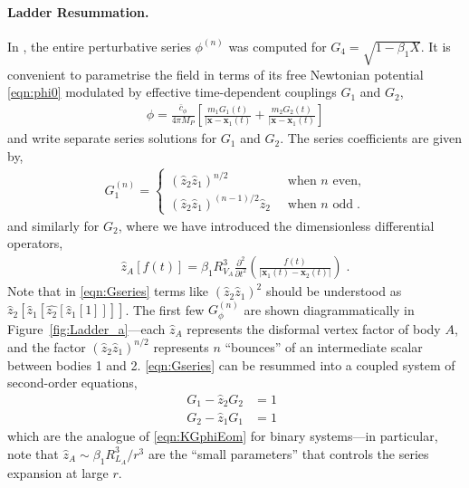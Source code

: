 \documentclass[11pt]{article}
\newcommand{\con}{  \bar{c}_{\phi} }
\begin{document}
\paragraph{Ladder Resummation.}
In \cite{Davis:2019ltc}, the entire perturbative series $\phi^{(n)}$ was computed for $G_4 = \sqrt{1-\beta_1 X}$. 
It is convenient to parametrise the field in terms of its free Newtonian potential \eqref{eqn:phi0} modulated by effective time-dependent couplings $G_1$ and $G_2$, 
\begin{align}
\phi = \frac{ \con}{4\pi M_P} \left[  \frac{m_1 G_1 (t)}{ | \mathbf{x} - \mathbf{x}_1 (t) }  +  \frac{m_2 G_2 (t)}{ | \mathbf{x} - \mathbf{x}_1 (t) }      \right] 
\end{align}
and write separate series solutions for $G_1$ and $G_2$. 
The series coefficients are given by, 
\begin{align}
 G_1^{(n)} = \begin{cases}
  \left( \hat{z}_{2} \hat{z}_{1} \right)^{n/2} &\text{when $n$ even,} \\
   \left( \hat{z}_{2} \hat{z}_{1} \right)^{ (n-1)/2} \hat{z}_{2} \;\; &\text{when $n$ odd} \; .   
   \end{cases}
 \label{eqn:Gseries}
\end{align}
and similarly for $G_2$, where we have introduced the dimensionless differential operators,
\begin{align}
\hat{z}_{A} \left[ f (t) \right] =   \beta_1 R_{V_A}^3  \frac{ \partial^2 }{  \partial t^2} \left(  \frac{f(t)}{ | \mathbf{x}_1 (t) - \mathbf{x}_2 (t) | }   \right)   \; .
\label{eqn:zhat}
\end{align}
Note that in \eqref{eqn:Gseries} terms like $(\hat{z}_2 \hat{z}_1 )^2$ should be understood as $\hat{z}_2 [ \hat{z}_1 [ \hat{z_2} [ \hat{z}_1 [ 1 ] ] ] ]$.
The first few $G_\phi^{(n)}$ are shown diagrammatically in Figure~\ref{fig:Ladder_a}---each $\hat{z}_A$ represents the disformal vertex factor of body $A$, and the factor $(\hat{z}_2 \hat{z}_1 )^{n/2}$ represents $n$ ``bounces'' of an intermediate scalar between bodies 1 and 2. 
\eqref{eqn:Gseries} can be resummed into a coupled system of second-order equations, 
\begin{align}
G_1 -  \hat{z}_{2} G_2 &= 1 \;\; \nonumber  \\
G_2 - \hat{z}_{1} G_1 &= 1   \;\; 
\label{eqn:ladder_eqn}
\end{align}
which are the analogue of \eqref{eqn:KGphiEom} for binary systems---in particular, note that $\hat{z}_A \sim  \beta_1 R_{L_A}^3 / r^3$ are the ``small parameters'' that controls the series expansion at large $r$. 
\end{document}
